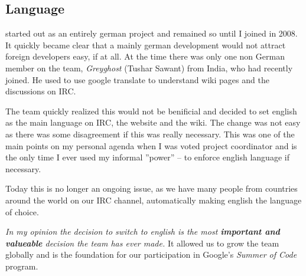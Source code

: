 \subsection{Language}
\UH{} started out as an entirely german project and remained so until I joined in 2008. It quickly became clear that a
mainly german development would not attract foreign developers easy, if at all. At the time there was only one non German
member on the team, \textit{Greyghost} (Tushar Sawant) from India, who had recently joined. He used to use google translate to
understand wiki pages and the discussions on IRC.

The team quickly realized this would not be benificial and decided to set english as the main language on IRC, the
website and the wiki. The change was not easy as there was some disagreement if this was really necessary. This was one
of the main points on my personal agenda when I was voted project coordinator and is the only time I ever used my
informal ''power'' -- to enforce english language if necessary.

Today this is no longer an ongoing issue, as we have many people from countries around the world on our IRC channel,
automatically making english the language of choice.

\textit{In my opinion the decision to switch to english is the most \textbf{important and valueable} decision the team
has ever made.} It allowed us to grow the team globally and is the foundation for our participation in Google's \textit{Summer
of Code} program.




